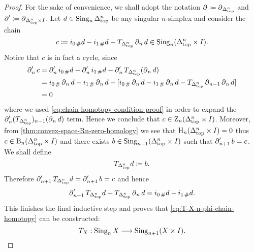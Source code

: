 \begin{proof}
For the sake of convenience, we shall adopt the notation
\(\operatorname{\partial} \coloneq \operatorname{\partial}_{\Delta_{\text{top}}^n}\) and
\(\operatorname{\partial}' \coloneq \operatorname{\partial}_{\Delta_{\text{top}}^n \times I}\). Let
\(d \in \operatorname{Sing}_n \Delta_{\text{top}}^n\) be any singular \(n\)-simplex and consider the
chain
\[
c \coloneq i_{0\, \#} d - i_{1\, \#} d -
T_{\Delta_{\text{top}}^n} \operatorname{\partial}_n d \in \operatorname{Sing}_n(\Delta_{\text{top}}^n \times I).
\]
Notice that \(c\) is in fact a cycle, since
\begin{align*}
  \operatorname{\partial}'_n c
  &= \operatorname{\partial}'_n i_{0\, \#} d -
     \operatorname{\partial}'_n i_{1\, \#} d -
     \operatorname{\partial}'_n T_{\Delta_{\text{top}}^n} (\operatorname{\partial}_n d) \\
  &= i_{0\, \#} \operatorname{\partial}_n d -
     i_{1\, \#} \operatorname{\partial}_n d -
    [
      i_{0\, \#} \operatorname{\partial}_n d - i_{1\, \#} \operatorname{\partial}_n d -
      T_{\Delta_{\text{top}}^n} \operatorname{\partial}_{n-1} \operatorname{\partial}_n d
    ] \\
  &= 0
\end{align*}
where we used \cref{eq:chain-homotopy-condition-proof} in order to expand the
\(\operatorname{\partial}'_n (T_{\Delta_{\text{top}}^n})_{n-1}(\operatorname{\partial}_n d)\) term. Hence we conclude that
\(c \in \operatorname{Z}_n(\Delta_{\text{top}}^n \times I)\). Moreover, from
\cref{thm:convex-space-Rn-zero-homology} we see that
\(\operatorname{H}_n(\Delta_{\text{top}}^n \times I) = 0\) thus \(c \in \operatorname{B}_n(\Delta_{\text{top}}^n \times I)\) and
there exists \(b \in \operatorname{Sing}_{n+1}(\Delta_{\text{top}}^n \times I)\) such that
\(\operatorname{\partial}_{n+1}' b = c\). We shall define
\[
T_{\Delta_{\text{top}}^n} d \coloneq b.
\]
Therefore \(\operatorname{\partial}_{n+1}' T_{\Delta_{\text{top}}^n} d = \operatorname{\partial}_{n+1}' b = c\) and hence
\[
\operatorname{\partial}'_{n+1} T_{\Delta_{\text{top}}^n} d + T_{\Delta_{\text{top}}^n} \operatorname{\partial}_n d
= i_{0\, \#} d - i_{1\, \#} d.
\]
This finishes the final inductive step and proves that
\cref{eq:T-X-n-phi-chain-homotopy} can be constructed:
\[
T_X: \operatorname{Sing}_n X \longrightarrow \operatorname{Sing}_{n+1}(X \times I).
\]


\end{proof}

